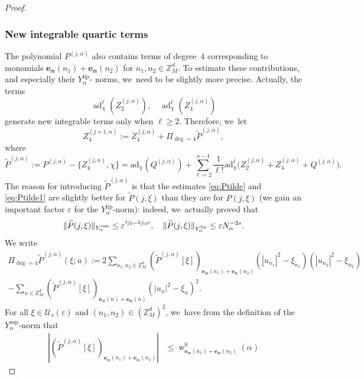 \documentclass[JEP,XML,SOM,Unicode,published]{cedram}
\DeclareMathOperator{\rw}{w}
\theoremstyle{plain}
\theoremstyle{definition}
\newcommand{\Z}{\mathbb{Z}}
\newcommand{\1}{\mathbf{1}}
\newcommand{\Ysup}[1]{Y_{#1}^{\mathrm{sup}}}
\newcommand{\Ylip}[1]{Y_{#1}^{\mathrm{lip}}}
\let\epsilon\varepsilon
\begin{document}
\begin{proof}
\subsubsection*{New integrable quartic terms} The polynomial $P^{(j,\alpha)}$ also contains terms of degree~$4$ corresponding to monomials $\boldsymbol{e}_{\mathfrak{m}}(n_1)+\boldsymbol{e}_{\mathfrak{m}}(n_2)$ for $n_{1},n_{2}\in\Z_{M}^{d}$. To estimate these contributions, and especially their $\Ylip{\alpha}$- norms, we~need to be slightly more precise. Actually, the terms
\[
\operatorname{ad}_{\chi}^{\ell}(Z_{2}^{(j,\alpha)}),\quad \operatorname{ad}_{\chi}^{\ell}(Z_{4}^{(j,\alpha)})
\]
generate new integrable terms only when $\ell\geq2$. Therefore, we~let
\begin{equation}
\label{eq:4+1}
Z_{4}^{(j+1,\alpha)} := Z_{4}^{(j,\alpha)} + \Pi_{\deg=4}\widetilde{P}^{(j,\alpha)},
\end{equation}
where
\[
\widetilde{P}^{(j,\alpha)}
:= P^{(j,\alpha)} - \{Z_{4}^{(j,\alpha)},\chi\}
=
\mathrm{ad}_{\chi}(Q^{(j,\alpha)})
+\sum_{\ell=2}^{\kappa-1}
\frac{1}{\ell!}
\mathrm{ad}_{\chi}^{\ell}
\big(
Z_{2}^{(j,\alpha)}+Z_{4}^{(j,\alpha)}+Q^{(j,\alpha)}
\big).
\]
The reason for introducing $\widetilde{P}^{(j,\alpha)}$ is that the estimates \eqref{eq:Ptilde} and \eqref{eq:Ptilde1} are slightly better for $\widetilde{P}(j,\xi)$ than they are for $P(j,\xi)$ (we gain an important factor $\epsilon$ for the $\Ylip{\alpha}$-norm): indeed, we~actually proved that
\[
\|\widetilde{P}(j,\xi)\|_{\Ysup{\alpha}}
\leq
\epsilon^{\sfrac{3}{2}-\sfrac{2}{10^{4}}},
\quad
\|\widetilde{P}(j,\xi)\|_{\Ylip{\alpha}}
\leq
\epsilon N_{\alpha}^{-2s}.
\]
We write
\begin{multline*}
\Pi_{\deg=4}\widetilde{P}^{(j,\alpha)}(\xi;u)
:=
2\sum_{n_{1},n_{2}\in\Z_{M}^{d}}
(\widetilde{P}^{(j,\alpha)}[\xi])_{\boldsymbol{e}_{\mathfrak{m}}(n_1)+\boldsymbol{e}_{\mathfrak{m}}(n_2)}
(|u_{n_{1}}|^{2}-\xi_{n_{1}})(|u_{n_{2}}|^{2}-\xi_{n_{2}})
\\
-
\sum_{n\in\Z_{M}^{d}}
(\widetilde{P}^{(j,\alpha)}[\xi])_{\boldsymbol{e}_{\mathfrak{m}}(n)+\boldsymbol{e}_{\mathfrak{m}}(n)}
(|u_{n}|^{2}-\xi_{n})^{2}.
\end{multline*}
For all $\xi\in\mathcal{U}_{s}(\epsilon)$ and $(n_{1},n_{2})\in(\Z_{M}^{d})^{2}$, we~have from the definition of the $\Ysup{\alpha}$-norm that
\begin{align*}
|(\widetilde{P}^{(j,\alpha)}[\xi])_{\boldsymbol{e}_{\mathfrak{m}}(n_1)+\boldsymbol{e}_{\mathfrak{m}}(n_2)}|
&\leq
\rw_{\boldsymbol{e}_{\mathfrak{m}}(n_1)+\boldsymbol{e}_{\mathfrak{m}}(n_2)}^{0}(\alpha)

\end{align*}
\end{proof}
\end{document}
